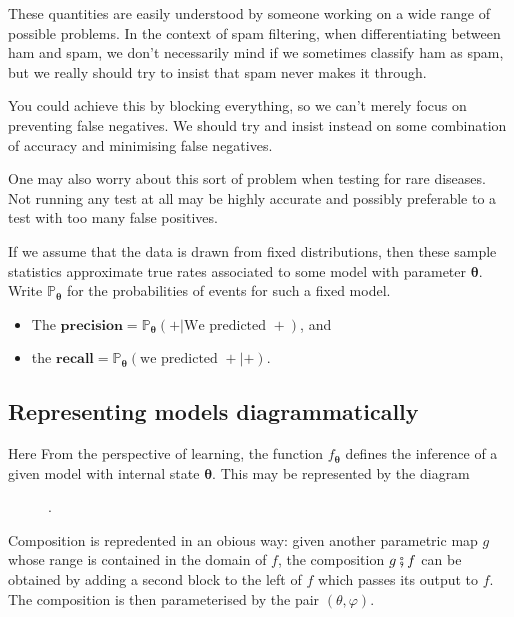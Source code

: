 \documentclass[10pt,a4paper]{article}
\begin{document}
These quantities are easily understood by someone working on a wide range of possible problems.
In the context of spam filtering, when differentiating between ham and spam, we don't necessarily mind if we sometimes classify ham as spam, but we really should try to insist that spam never makes it through.

You could achieve this by blocking everything, so we can't merely focus on preventing false negatives.
We should try and insist instead on some combination of accuracy and minimising false negatives.

One may also worry about this sort of problem when testing for rare diseases.
Not running any test at all may be highly accurate and possibly preferable to a test with too many false positives.

If we assume that the data is drawn from fixed distributions, then these sample statistics approximate true rates associated to some model with parameter $\boldsymbol\theta$.
Write $\mathbb P_{\boldsymbol\theta}$ for the probabilities of events for such a fixed model.
\begin{itemize}
\item The $\textbf{precision}=\mathbb P_{\boldsymbol\theta}(+|\text{We predicted }+)$, and
\item the $\textbf{recall}=\mathbb P_{\boldsymbol\theta}(\text{we predicted }+|+)$.
\end{itemize}
\subsection{Representing models diagrammatically}
Here 
From the perspective of learning, the function $f_{\boldsymbol\theta}$ defines the inference of a given model with internal state $\boldsymbol\theta$.
This may be represented by the diagram
\begin{figure}[H]
\centering
{}.
\end{figure}
Composition is repredented in an obious way: given another parametric map $g$ whose range is contained in the domain of $f$, the composition $g\fatsemi f$ can be obtained by adding a second block to the left of $f$ which passes its output to $f$.
The composition is then parameterised by the pair $(\theta,\varphi)$.
\end{document}
